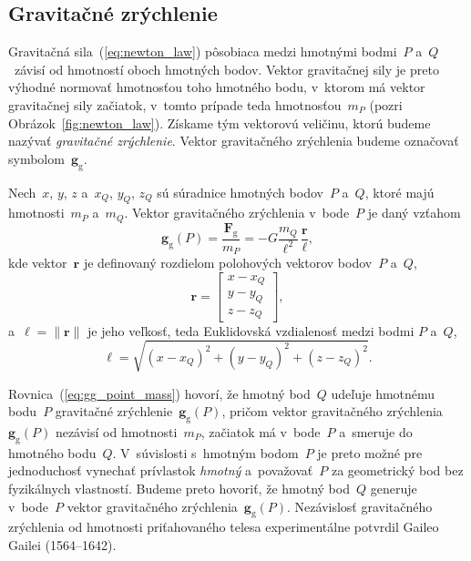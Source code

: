 \documentclass[a4paper,12pt]{book}
\newcommand{\gidx}{\mathrm g}
\let\vec\mathbf
\begin{document}
\subsection{Gravitačné zrýchlenie}
\label{sec:gg}

Gravitačná sila~(\ref{eq:newton_law}) pôsobiaca medzi hmotnými bodmi~$P$ 
a~$Q$~závisí od hmotností oboch hmotných bodov.  Vektor gravitačnej sily je 
preto výhodné normovať hmotnosťou toho hmotného bodu, v~ktorom má vektor 
gravitačnej sily začiatok, v~tomto prípade teda hmotnosťou~$m_P$ (pozri 
Obrázok~\ref{fig:newton_law}).  Získame tým vektorovú veličinu, ktorú budeme 
nazývať \emph{gravitačné zrýchlenie}.  Vektor gravitačného zrýchlenia budeme 
označovať symbolom~$\vec g_\gidx$.

Nech~$x$, $y$, $z$ a~$x_Q$, $y_Q$, $z_Q$ sú súradnice hmotných bodov~$P$ a~$Q$, 
ktoré majú hmotnosti~$m_P$ a~$m_Q$.  Vektor gravitačného zrýchlenia v~bode~$P$ 
je daný vzťahom
%
\begin{equation}
\label{eq:gg_point_mass}
\vec g_\gidx(P) = \frac{\vec F_\gidx}{m_P} = -G \frac{m_Q}{\ell^2} \, 
\frac{\vec r}{\ell}{,}
\end{equation}
%
kde vektor~$\vec r$ je definovaný rozdielom polohových vektorov bodov~$P$ 
a~$Q$,
%
\begin{equation}
\label{eq:r}
\vec r =
%
\begin{bmatrix}
x - x_Q \\
y - y_Q \\
z - z_Q
\end{bmatrix}
{,}
\end{equation}
%
a~$\ell = \| \vec r \|$ je jeho veľkosť, teda Euklidovská vzdialenosť medzi 
bodmi $P$ a~$Q$,
%
\begin{equation}
\label{eq:l}
\ell = \sqrt{(x - x_Q)^2 + (y - y_Q)^2 + (z - z_Q)^2}{.}
\end{equation}

Rovnica~(\ref{eq:gg_point_mass}) hovorí, že hmotný
bod~$Q$ udeľuje hmotnému bodu~$P$ gravitačné zrýchlenie~$\vec g_\gidx(P)$, 
pričom vektor gravitačného zrýchlenia~$\vec g_\gidx(P)$ nezávisí od 
hmotnosti~$m_P$, začiatok má v~bode~$P$ a~smeruje do hmotného bodu~$Q$.  
V~súvislosti
s~hmotným bodom~$P$ je preto možné pre jednoduchosť vynechať prívlastok
\emph{hmotný} a~považovať~$P$ za geometrický bod bez fyzikálnych vlastností.  
Budeme preto hovoriť, že hmotný bod~$Q$ generuje v~bode~$P$ vektor gravitačného 
zrýchlenia~$\vec g_\gidx(P)$.  Nezávislosť gravitačného zrýchlenia od hmotnosti 
priťahovaného telesa experimentálne potvrdil Gaileo Gailei (1564--1642).
\end{document}
